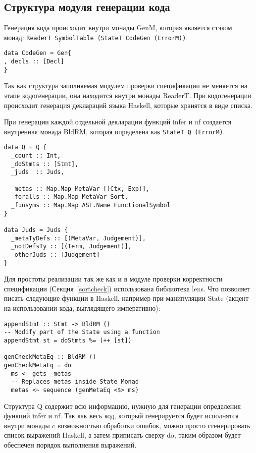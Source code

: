 \subsection{Структура модуля генерации кода}\label{repr}
Генерация кода происходит внутри монады GenM, которая является стэком монад: \lstinline{ReaderT SymbolTable (StateT CodeGen (ErrorM))}.

\begin{lstlisting}[caption={Структура используемая при кодогенерации},captionpos=b,frame=single]
data CodeGen = Gen{
, decls :: [Decl]
}
\end{lstlisting}

Так как структура заполняемая модулем проверки спецификации не меняется на этапе кодогенерации, она находится внутри монады ReaderT. При кодогенерации происходит генерация деклараций языка Haskell, которые хранятся в виде списка.

При генерации каждой отдельной декларации функций infer и nf создается внутренная монада BldRM, которая определена как \lstinline{StateT Q (ErrorM)}.

\begin{lstlisting}[caption={Структура используемая при кодогенерации функции infer},captionpos=b,frame=single]
data Q = Q {
  _count :: Int,
  _doStmts :: [Stmt],
  _juds  :: Juds,

  _metas :: Map.Map MetaVar [(Ctx, Exp)],
  _foralls :: Map.Map MetaVar Sort,
  _funsyms :: Map.Map AST.Name FunctionalSymbol
}

data Juds = Juds {
  _metaTyDefs :: [(MetaVar, Judgement)],
  _notDefsTy :: [(Term, Judgement)],
  _otherJuds :: [Judgement]
}
\end{lstlisting}

Для простоты реализации так же как и в модуле проверки корректности спецификации (Секция~\ref{sortcheck}) использована библиотека lens\cite{lens}. Что позволяет писать следующие функции в Haskell, например при манипуляции State (акцент на использовании кода, выглядящего императивно):

\begin{lstlisting}[frame=single]
appendStmt :: Stmt -> BldRM ()
-- Modify part of the State using a function
appendStmt st = doStmts %= (++ [st])

genCheckMetaEq :: BldRM ()
genCheckMetaEq = do
  ms <- gets _metas
  -- Replaces metas inside State Monad
  metas <~ sequence (genMetaEq <$> ms)
\end{lstlisting}

Структура Q содержит всю информацию, нужную для генерации определения функций infer и nf. Так как весь код, который генерируется будет исполнятся внутри монады c возможностью обработки ошибок, можно просто сгенерировать список выражений Haskell, а затем приписать сверху do, таким образом будет обеспечен порядок выполнения выражений.

